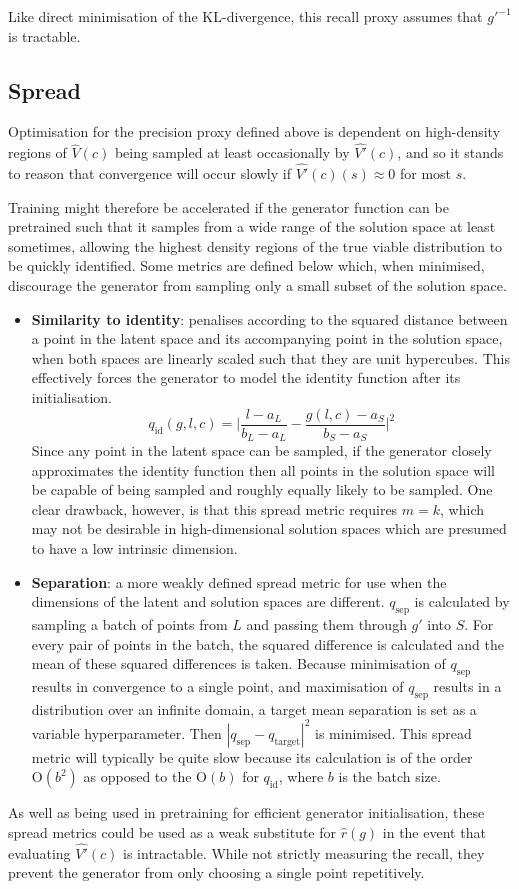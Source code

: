 \documentclass[../../main.tex]{subfiles}
\begin{document}
Like direct minimisation of the KL-divergence, this recall proxy assumes that $g'^{-1}$ is tractable.

\subsection{Spread}

Optimisation for the precision proxy defined above is dependent on high-density regions of $\hat{V}(c)$ being sampled at least occasionally by $\hat{V'}(c)$, and so it stands to reason that convergence will occur slowly if $\hat{V'}(c)(s) \approx 0$ for most $s$.

Training might therefore be accelerated if the generator function can be pretrained such that it samples from a wide range of the solution space at least sometimes, allowing the highest density regions of the true viable distribution to be quickly identified.
Some metrics are defined below which, when minimised, discourage the generator from sampling only a small subset of the solution space.
\begin{itemize}
    \item[] \textbf{Similarity to identity}: penalises according to the squared distance between a point in the latent space and its accompanying point in the solution space, when both spaces are linearly scaled such that they are unit hypercubes.
    This effectively forces the generator to model the identity function after its initialisation.
    $$q_\text{id}(g, l, c) = \bigg|\frac{l - a_L}{b_L - a_L} -
    \frac{g(l, c) - a_S}{b_S - a_S}\bigg|^2$$
    Since any point in the latent space can be sampled, if the generator closely approximates the identity function then all points in the solution space will be capable of being sampled and roughly equally likely to be sampled.
    One clear drawback, however, is that this spread metric requires $m = k$, which may not be desirable in high-dimensional solution spaces which are presumed to have a low intrinsic dimension.
    \item[] \textbf{Separation}: a more weakly defined spread metric for use when the dimensions of the latent and solution spaces are different.
    $q_\text{sep}$ is calculated by sampling a batch of points from $L$ and passing them through $g'$ into $S$.
    For every pair of points in the batch, the squared difference is calculated and the mean of these squared differences is taken.
    Because minimisation of $q_\text{sep}$ results in convergence to a single point, and maximisation of $q_\text{sep}$ results in a distribution over an infinite domain, a target mean separation is set as a variable hyperparameter.
    Then $|q_\text{sep} - q_\text{target}|^2$ is minimised.
    This spread metric will typically be quite slow because its calculation is of the order $\text{O}(b^2)$ as opposed to the $\text{O}(b)$ for $q_\text{id}$, where $b$ is the batch size.
  \end{itemize}
As well as being used in pretraining for efficient generator initialisation, these spread metrics could be used as a weak substitute for $\hat{r}(g)$ in the event that evaluating $\hat{V'}(c)$ is intractable.
While not strictly measuring the recall, they prevent the generator from only choosing a single point repetitively.
\end{document}
